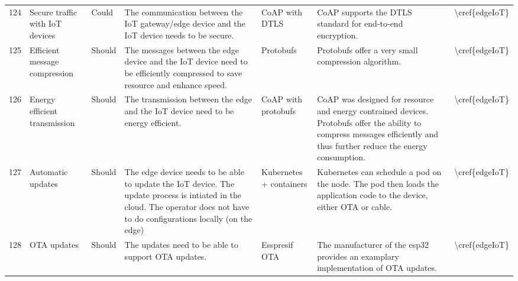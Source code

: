 \begin{table}[]
\begin{tabular}{lllllll}
124 & Secure traffic with IoT devices         & Could          & The communication between the IoT gateway/edge device and the IoT device needs to be secure.                                                                                               & CoAP with DTLS           & CoAP supports the DTLS standard for end-to-end encryption.                                                                                                                                                                     & \textbackslash{}cref\{edgeIoT\}    \\
125 & Efficient message compression           & Should         & The messages between the edge device and the IoT device need to be efficiently compressed to save resource and enhance speed.                                                              & Protobufs                & Protobufs offer a very small compression algorithm.                                                                                                                                                                            & \textbackslash{}cref\{edgeIoT\}    \\
126 & Energy efficient transmission           & Should         & The transmission between the edge and the IoT device need to be energy efficient.                                                                                                          & CoAP with protobufs      & CoAP was designed for resource and energy contrained devices. Protobufs offer the ability to compress messages efficiently and thus further reduce the energy consumption.                                                     & \textbackslash{}cref\{edgeIoT\}    \\
127 & Automatic updates                       & Should         & The edge device needs to be able to update the IoT device. The update process is intiated in the cloud. The operator does not have to do configurations locally (on the edge)              & Kubernetes + containers  & Kubernetes can schedule a pod on the node. The pod then loads the application code to the device, either OTA or cable.                                                                                                         & \textbackslash{}cref\{edgeIoT\}    \\
128 & OTA updates                             & Should         & The updates need to be able to support OTA updates.                                                                                                                                        & Esspresif OTA            & The manufacturer of the esp32 provides an examplary implementation of OTA updates.                                                                                                                                             & \textbackslash{}cref\{edgeIoT\}    \\

\end{tabular}
\end{table}
